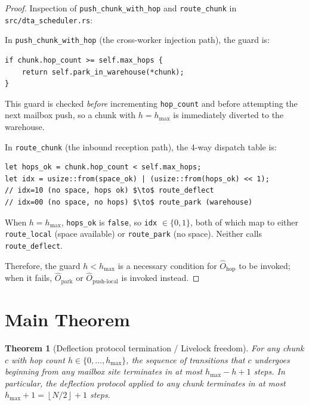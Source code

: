 \documentclass[11pt,a4paper]{report}
\newtheorem{theorem}{Theorem}[section]
\newcommand{\floor}[1]{\left\lfloor #1 \right\rfloor}
\newcommand{\code}[1]{\texttt{#1}}
\begin{document}
\begin{proof}
Inspection of \code{push\_chunk\_with\_hop} and \code{route\_chunk}
in \texttt{src/dta\_scheduler.rs}:

In \code{push\_chunk\_with\_hop} (the cross-worker injection path),
the guard is:
\begin{verbatim}
if chunk.hop_count >= self.max_hops {
    return self.park_in_warehouse(*chunk);
}
\end{verbatim}
This guard is checked \emph{before} incrementing \code{hop\_count}
and before attempting the next mailbox push, so a chunk with
$h = h_{\max}$ is immediately diverted to the warehouse.

In \code{route\_chunk} (the inbound reception path), the 4-way
dispatch table is:
\begin{verbatim}
let hops_ok = chunk.hop_count < self.max_hops;
let idx = usize::from(space_ok) | (usize::from(hops_ok) << 1);
// idx=10 (no space, hops ok) $\to$ route_deflect
// idx=00 (no space, no hops) $\to$ route_park (warehouse)
\end{verbatim}
When $h = h_{\max}$, \code{hops\_ok} is \code{false}, so
\code{idx} $\in \{0, 1\}$, both of which map to either
\code{route\_local} (space available) or \code{route\_park} (no
space).  Neither calls \code{route\_deflect}.

Therefore, the guard $h < h_{\max}$ is a necessary condition for
$\hat{O}_{\text{hop}}$ to be invoked; when it fails, $\hat{O}_{\text{park}}$
or $\hat{O}_{\text{push-local}}$ is invoked instead.
\end{proof}

\section{Main Theorem}

\begin{theorem}[Deflection protocol termination / Livelock freedom]
\label{thm:livelock}
For any chunk $c$ with hop count $h \in \{0, \ldots, h_{\max}\}$,
the sequence of transitions that $c$ undergoes beginning from any
mailbox site terminates in at most $h_{\max} - h + 1$ steps.
In particular, the deflection protocol applied to any chunk
terminates in at most $h_{\max} + 1 = \floor{N/2} + 1$ steps.
\end{theorem}
\end{document}
